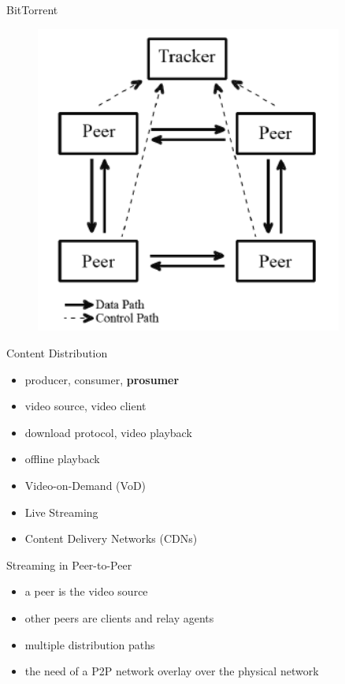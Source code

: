 \documentclass{beamer}
\begin{document}
\begin{frame}{BitTorrent}
  \begin{figure}
    \includegraphics[width=0.9\textwidth]{img/bittorrent-overview}
  \end{figure}
\end{frame}

\begin{frame}{Content Distribution}
  \begin{itemize}
    \item producer, consumer, \textbf{prosumer}
    \item video source, video client
    \item download protocol, video playback
    \item offline playback
    \item Video-on-Demand (VoD)
    \item Live Streaming
    \item Content Delivery Networks (CDNs)
  \end{itemize}
\end{frame}

\begin{frame}{Streaming in Peer-to-Peer}
  \begin{itemize}
    \item a peer is the video source
    \item other peers are clients and relay agents
    \item multiple distribution paths
    \item the need of a P2P network overlay over the physical network
  \end{itemize}
\end{frame}
\end{document}
